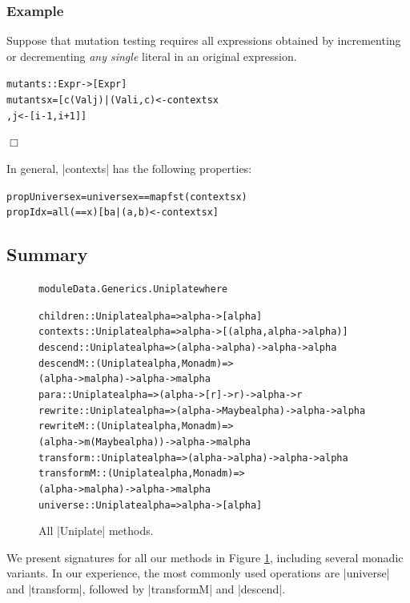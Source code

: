 \documentclass[preprint]{sigplanconf}
\newcounter{exmp}
\newcommand{\yesexample}{\refstepcounter{exmp}\subsubsection*{Example \arabic{exmp}}}
\newcommand{\noexample}{\hfill$\Box$}
\newenvironment{code}{\begin{alltt}\small}{\end{alltt}}
\newenvironment{example}{\yesexample}{\noexample}
\newcommand{\figureend}{\vspace{-4mm}}
\begin{document}
\begin{example}
Suppose that mutation testing requires all expressions obtained by incrementing or decrementing \textit{any single} literal in an original expression.

\begin{code}
mutants :: Expr -> [Expr]
mutants x =  [c (Val j)  |  (Val i, c) <- contexts x
                         ,  j <- [i-1, i+1]]
\end{code}
\end{example}

In general, |contexts| has the following properties:

\begin{code}
propUniverse  x = universe x == map fst (contexts x)
propId        x = all (== x) [b a | (a,b) <- contexts x]
\end{code}



\subsection{Summary}

\begin{figure}
\begin{code}
module Data.Generics.Uniplate where

children    :: Uniplate alpha => alpha -> [alpha]
contexts    :: Uniplate alpha => alpha -> [(alpha, alpha -> alpha)]
descend     :: Uniplate alpha => (alpha -> alpha) -> alpha -> alpha
descendM    :: (Uniplate alpha, Monad m) =>
                  (alpha -> m alpha) -> alpha -> m alpha
para        :: Uniplate alpha => (alpha -> [r] -> r) -> alpha -> r
rewrite     :: Uniplate alpha => (alpha -> Maybe alpha) -> alpha -> alpha
rewriteM    :: (Uniplate alpha, Monad m)  =>
                  (alpha -> m (Maybe alpha)) -> alpha -> m alpha
transform   :: Uniplate alpha => (alpha -> alpha) -> alpha -> alpha
transformM  :: (Uniplate alpha, Monad m) =>
                  (alpha -> m alpha) -> alpha -> m alpha
universe    :: Uniplate alpha => alpha -> [alpha]
\end{code}
\caption{All |Uniplate| methods.}
\label{fig:play}
\figureend
\end{figure}

We present signatures for all our methods in Figure \ref{fig:play}, including several monadic variants. In our experience, the most commonly used operations are |universe| and |transform|, followed by |transformM| and |descend|.
\end{document}
